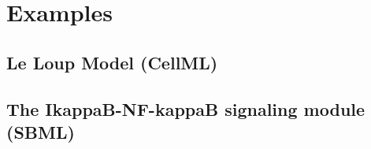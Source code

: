 \chapter{Examples}

\section{Le Loup Model (CellML)}


\newpage
\section{The IkappaB-NF-kappaB signaling module (SBML)}
